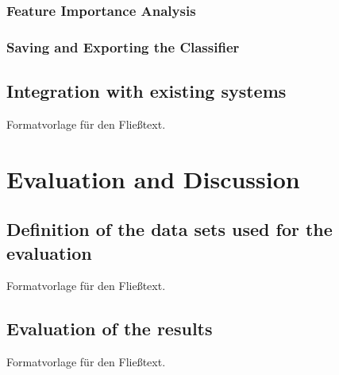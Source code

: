 \documentclass[a4paper,12pt,twoside]{scrreprt}
\begin{document}
\subsection{Feature Importance Analysis}

\subsection{Saving and Exporting the Classifier}

\section{Integration with existing systems}
Formatvorlage für den Fließtext.

\chapter{Evaluation and Discussion}

\section{Definition of the data sets used for the evaluation}
Formatvorlage für den Fließtext.

\section{Evaluation of the results}
Formatvorlage für den Fließtext.
\end{document}
